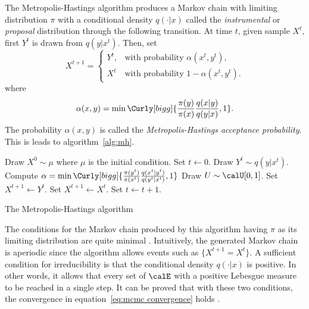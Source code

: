 The Metropolis-Hastings algorithm produces a Markov chain with limiting
distribution $\pi$ with a conditional density $q(\cdot|x)$ called the
\emph{instrumental} or \emph{proposal} distribution through the following
transition. At time $t$, given sample $X^t$, first $Y^t$ is drawn from
$q(y|x^t)$. Then, set
\begin{equation*}
  X^{t+1} =
  \begin{cases}
    Y^t, &\text{with probability } \alpha(x^t,y^t),\\
    X^t  &\text{with probability } 1 - \alpha(x^t,y^t).
  \end{cases}
\end{equation*}
where
\begin{equation}
  \alpha(x,y) =
  \min\Curly[bigg]{\frac{\pi(y)}{\pi(x)}\frac{q(x|y)}{q(y|x)},1}.
\end{equation}
The probability $\alpha(x,y)$ is called the \emph{Metropolis-Hastings
  acceptance probability}. This is leads to algorithm~\ref{alg:mh}.

\begin{algorithm}
\begin{algorithmic}
  \tophrule
  \STATE Draw $X^0\sim\mu$ where $\mu$ is the initial condition.
  \STATE Set $t\leftarrow0$.
  \REPEAT
    \STATE Draw $Y^t\sim q(y|x^t)$.
    \STATE Compute $\alpha = \min\Curly[bigg]{
      \frac{\pi(y^t)}{\pi(x^t)}\frac{q(x^t|y^t)}{q(y^t|x^t)}, 1}$
    \STATE Draw $U\sim\calU[0,1]$.
      \STATE Set $X^{t+1}\leftarrow Y^t$.
    \ELSE
      \STATE Set $X^{t+1}\leftarrow X^t$.
    \ENDIF
    \STATE Set $t\leftarrow t+1$.
  \bottomhrule
\end{algorithmic}
\caption{The Metropolis-Hastings algorithm}
\label{alg:mh}
\end{algorithm}

The conditions for the Markov chain produced by this algorithm having $\pi$ as
its limiting distribution are quite minimal
\cite[][sec.~7.3.2]{Robert:2004tn}. Intuitively, the generated Markov chain is
aperiodic since the algorithm allows events such as $\{X^{t+1} = X^t\}$. A
sufficient condition for irreducibility is that the conditional density
$q(\cdot|x)$ is positive. In other words, it allows that every set of $\calE$
with a positive Lebesgue measure to be reached in a single step. It can be
proved that with these two conditions, the convergence in
equation~\eqref{eq:mcmc convergence} holds \cite[][Theorem~7.4 and
Corollary~7.5]{Robert:2004tn}.

